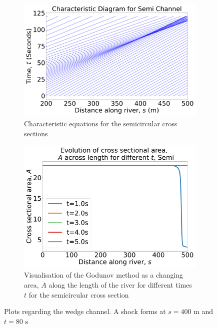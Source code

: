 \documentclass[12pt]{article}
\begin{document}
\begin{figure}[ht]
    \centering
    \begin{subfigure}[b]{0.49\textwidth}
        \centering
        \includegraphics[width=\textwidth]{Figures/Semi_characteristic.pdf}
        \caption{Characteristic equations for the semicircular cross sections}
        \label{fig:semi_char}
    \end{subfigure}
    \hfill
    \begin{subfigure}[b]{0.49\textwidth}
        \centering
        \includegraphics[width=\textwidth]{Figures/Semi_godunov.pdf}
        \caption{Visualisation of the Godunov method as a changing area, $A$ along the length of the river for different times $t$ for the semicircular cross section}
        \label{fig:semi_godunov}
    \end{subfigure}
    \caption{Plots regarding the wedge channel. A shock forms at $s= 400\text{ m}$ and $t= 80\text{ s}$}
\end{figure}
\end{document}
